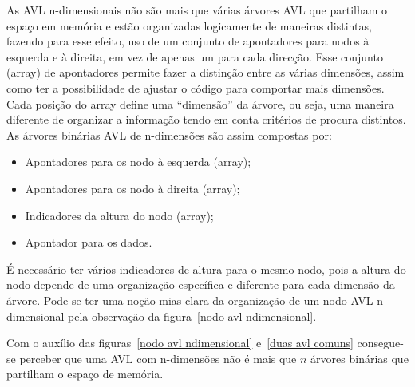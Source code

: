 \documentclass[a5paper,twocolumn, 11pt]{article}
\def\hyph{-\penalty0\hskip0pt\relax}
\begin{document}
As AVL n\hyph{}dimensionais não são mais que várias árvores AVL que partilham o espaço em memória e estão organizadas logicamente de maneiras distintas, fazendo para esse efeito, uso de um conjunto de apontadores para nodos à esquerda e à direita, em vez de apenas um para cada direcção. Esse conjunto (array) de apontadores permite fazer a distinção entre as várias dimensões, assim como ter a possibilidade de ajustar o código para comportar mais dimensões. Cada posição do array define uma ``dimensão'' da árvore, ou seja, uma maneira diferente de organizar a informação tendo em conta critérios de procura distintos.
As árvores binárias AVL de n\hyph{}dimensões são assim compostas por:
\begin{itemize}
\item{Apontadores para os nodo à esquerda (array);}
\item{Apontadores para os nodo à direita (array);}
\item{Indicadores da altura do nodo (array);}
\item{Apontador para os dados.}
\end{itemize}
É necessário ter vários indicadores de altura para o mesmo nodo, pois a altura do nodo depende de uma organização específica e diferente para cada dimensão da árvore. Pode-se ter uma noção mias clara da organização de um nodo AVL n\hyph{}dimensional pela observação da figura~\ref{nodo avl ndimensional}.

Com o auxílio das figuras~\ref{nodo avl ndimensional} e~\ref{duas avl comuns} consegue-se perceber que uma AVL com n\hyph{}dimensões não é mais que $n$ árvores binárias que partilham o espaço de memória.

\clearpage
\end{document}
